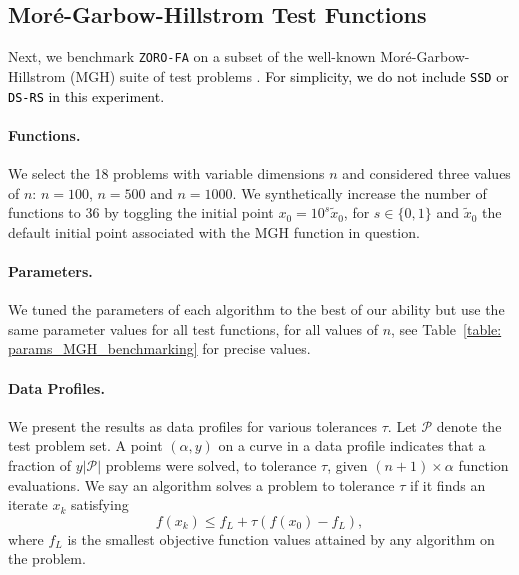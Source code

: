 \subsection{Mor\'{e}-Garbow-Hillstrom Test Functions}
\label{sec:MGH}

Next, we benchmark {\tt ZORO-FA} on a subset of the well-known Mor\'{e}-Garbow-Hillstrom (MGH) suite of test problems \cite{more1981testing}. \textcolor{black}{For simplicity, we do not include {\tt SSD} or {\tt DS-RS} in this experiment.}

\paragraph{Functions.} We select the 18 problems with variable dimensions $n$ and considered three values of $n$: $n=100$, $n=500$ and $n=1000$. We synthetically increase the number of functions to 36 by toggling the initial point $x_0 = 10^s\tilde{x}_0$, for $s \in \{0,1\}$ and $\tilde{x}_0$ the default initial point associated with the MGH function in question.

\paragraph{Parameters.} We tuned the parameters of each algorithm to the best of our ability but use the same parameter values for all test functions, for all values of $n$, see Table~\ref{table: params_MGH_benchmarking} for precise values. 

\paragraph{Data Profiles.} We present the results as data profiles \cite{more2009benchmarking} for various tolerances $\tau$. Let $\mathcal{P}$ denote the test problem set. A point $(\alpha, y)$ on a curve in a data profile indicates that a fraction of $y|\mathcal{P}|$ problems were solved, to tolerance $\tau$, given $(n+1)\times \alpha$ function evaluations. We say an algorithm solves a problem to tolerance $\tau$ if it finds an iterate $x_k$ satisfying
\begin{equation}
  f(x_k) \leq f_{L} + \tau \left(f(x_0) - f_L\right),  
\end{equation}
where $f_L$ is the smallest objective function values attained by any algorithm on the problem.

